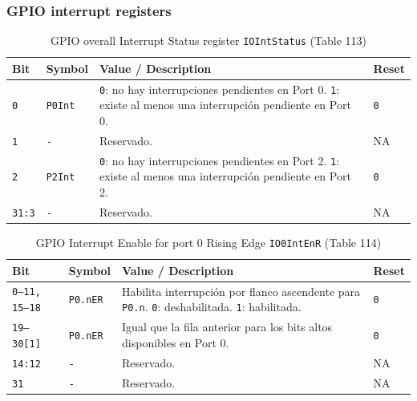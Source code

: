 \subsubsection{GPIO interrupt registers}

\begin{table}[H]
  \centering
  \small
  \caption{GPIO overall Interrupt Status register \texttt{IOIntStatus} (Table 113)}
  \begin{tabularx}{0.96\textwidth}{|>{\centering\arraybackslash}p{}|>{\raggedright\arraybackslash}p{}|>{\raggedright\arraybackslash}X|>{\centering\arraybackslash}p{}|}
    \hline
    \textbf{Bit} & \textbf{Symbol} & \textbf{Value / Description} & \textbf{Reset} \\
    \hline
    \texttt{0} & \texttt{P0Int} & \texttt{0}: no hay interrupciones pendientes en Port 0. \texttt{1}: existe al menos una interrupción pendiente en Port 0. & \texttt{0} \\
    \hline
    \texttt{1} & \texttt{-} & Reservado. & NA \\
    \hline
    \texttt{2} & \texttt{P2Int} & \texttt{0}: no hay interrupciones pendientes en Port 2. \texttt{1}: existe al menos una interrupción pendiente en Port 2. & \texttt{0} \\
    \hline
    \texttt{31:3} & \texttt{-} & Reservado. & NA \\
    \hline
  \end{tabularx}
\end{table}

\begin{table}[H]
  \centering
  \small
  \caption{GPIO Interrupt Enable for port 0 Rising Edge \texttt{IO0IntEnR} (Table 114)}
  \begin{tabularx}{0.96\textwidth}{|>{\centering\arraybackslash}p{}|>{\raggedright\arraybackslash}p{}|>{\raggedright\arraybackslash}X|>{\centering\arraybackslash}p{}|}
    \hline
    \textbf{Bit} & \textbf{Symbol} & \textbf{Value / Description} & \textbf{Reset} \\
    \hline
    \texttt{0--11, 15--18} & \texttt{P0.nER} & Habilita interrupción por flanco ascendente para \texttt{P0.n}. \texttt{0}: deshabilitada. \texttt{1}: habilitada. & \texttt{0} \\
    \hline
    \texttt{19--30[1]} & \texttt{P0.nER} & Igual que la fila anterior para los bits altos disponibles en Port 0. & \texttt{0} \\
    \hline
    \texttt{14:12} & \texttt{-} & Reservado. & NA \\
    \hline
    \texttt{31} & \texttt{-} & Reservado. & NA \\
    \hline
  \end{tabularx}
\end{table}

